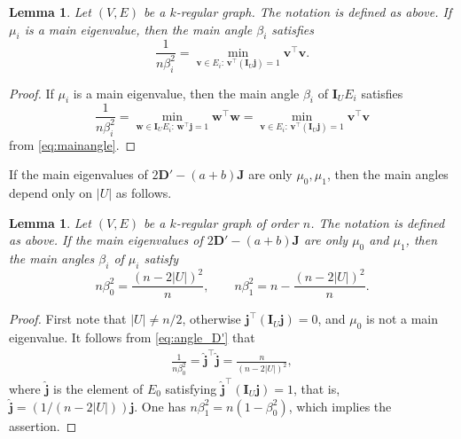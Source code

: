 \documentclass[a4paper, 11pt]{article}
\newcommand{\J}{\boldsymbol{J}}
\newcommand{\I}{\boldsymbol{I}}
\newcommand{\D}{\boldsymbol{D}}
\newcommand{\jv}{\boldsymbol{j}}
\newcommand{\vv}{\boldsymbol{v}}
\newtheorem{lemma}[theorem]{Lemma}
\theoremstyle{definition}
\begin{document}
\begin{lemma} \label{lem:cal_angle}
Let $(V,E)$ be a $k$-regular graph. The notation is defined as above. 
If $\mu_i$ is a main eigenvalue, then the main angle $\beta_i$ satisfies
\begin{equation}\label{eq:angle_D'}
\frac{1}{n\beta_i^2}=\min_{\vv \in E_i:\, \vv^\top (\I_U \jv)=1} \vv^\top \vv. 
\end{equation}
\end{lemma}
\begin{proof} 
If $\mu_i$ is a main eigenvalue, then the main angle $\beta_i$ of  $\I_U E_i$ satisfies
\begin{equation*}
\frac{1}{n\beta_i^2}=
\min_{\boldsymbol{w} \in \I_U E_i:\, \boldsymbol{w}^\top \jv=1} \boldsymbol{w}^\top \boldsymbol{w}
=\min_{\vv \in E_i:\, \vv^\top (\I_U \jv)=1} \vv^\top \vv
\end{equation*}
from \eqref{eq:mainangle}.
\end{proof}
If the main eigenvalues of $2\D'-(a+b)\J$ are only $\mu_0,\mu_1$, then the main angles depend only on $|U|$ as follows. 
\begin{lemma}\label{lem:main_angle2}
Let $(V,E)$ be a $k$-regular graph of order $n$.  The notation is defined as above. 
If the main eigenvalues of $2\D'-(a+b)\J$ are only $\mu_0$ and $\mu_1$, then the main angles $\beta_i$ of 
$\mu_i$ satisfy \[
n \beta_0^2=\frac{(n-2|U|)^2}{n},\qquad 
n\beta_1^2=n-\frac{(n-2|U|)^2}{n}.
\]
\end{lemma}
\begin{proof}
First note that $|U|\ne n/2$, otherwise 
 $\jv^\top (\I_U \jv) = 0$, and $\mu_0$ is not a main eigenvalue. 
It follows from \eqref{eq:angle_D'} that 
\begin{align*}
\frac{1}{n \beta_0^2}=  \hat{\jv}^\top \hat{\jv}
=\frac{n}{(n-2|U|)^2},
\end{align*}
where $\hat{\jv}$ is the element of $E_0$ satisfying $\hat{\jv}^\top (\I_U\jv)=1$, that is, $\hat{\jv}=(1/(n-2|U|))\jv$. 
One has $n\beta_1^2=n(1-\beta_0^2)$, which implies the assertion. 
\end{proof}
\end{document}
